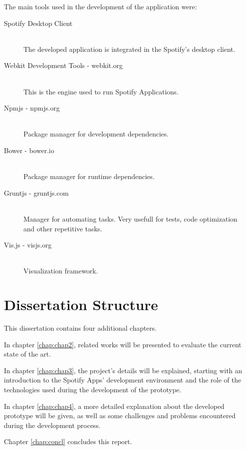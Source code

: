 The main tools used in the development of the application were:

\begin{description}
  \item[Spotify Desktop Client] \hfill \\
    The developed application is integrated in the Spotify's desktop client.
  \item[Webkit Development Tools - webkit.org] \hfill \\
    This is the engine used to run Spotify Applications.
  \item[Npmjs - npmjs.org] \hfill \\
    Package manager for development dependencies.
  \item[Bower - bower.io] \hfill \\
    Package manager for runtime dependencies.
  \item[Gruntjs - gruntjs.com] \hfill \\
    Manager for automating tasks. Very usefull for tests, code optimization and other repetitive tasks.
  \item[Vis.js - visjs.org] \hfill \\
    Visualization framework.
\end{description}


\section{Dissertation Structure} \label{sec:struct}

This dissertation contains four additional chapters.

In chapter \ref{chap:chap2}, related works will be presented to evaluate the current state of the art.

In chapter \ref{chap:chap3}, the project's details will be explained, starting with an introduction to the Spotify Apps' development environment and the role of the technologies used during the development of the prototype.

In chapter \ref{chap:chap4}, a more detailed explanation about the developed prototype will be given, as well as some challenges and problems encountered during the development process.

Chapter \ref{chap:concl} concludes this report.
